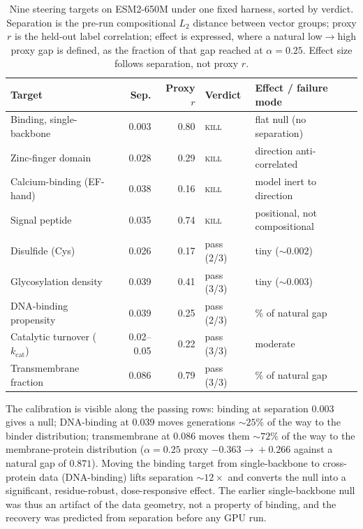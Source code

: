 \documentclass{article}
\begin{document}
\FloatBarrier
\begin{table}[htbp]
\centering
\caption{Nine steering targets on ESM2-650M under one fixed harness, sorted by
verdict. Separation is the pre-run compositional $L_2$ distance between vector
groups; proxy $r$ is the held-out label correlation; effect is expressed, where
a natural low$\rightarrow$high proxy gap is defined, as the fraction of that gap
reached at $\alpha=0.25$. Effect size follows separation, not proxy $r$.}
\label{tab:scoreboard}
\small
\begin{tabular}{@{}>{\raggedright\arraybackslash}p{3.5cm}
                    r r
                    >{\raggedright\arraybackslash}p{2.1cm}
                    >{\raggedright\arraybackslash}p{3.4cm}@{}}
\toprule
Target & Sep. & Proxy $r$ & Verdict & Effect / failure mode \\
\midrule
Binding, single-backbone   & 0.003 & 0.80 & \textsc{kill} & flat null (no separation) \\
Zinc-finger domain         & 0.028 & 0.29 & \textsc{kill} & direction anti-correlated \\
Calcium-binding (EF-hand)  & 0.038 & 0.16 & \textsc{kill} & model inert to direction \\
Signal peptide             & 0.035 & 0.74 & \textsc{kill} & positional, not compositional \\
\addlinespace
Disulfide (Cys)            & 0.026 & 0.17 & pass (2/3) & tiny ($\sim\!0.002$) \\
Glycosylation density      & 0.039 & 0.41 & pass (3/3) & tiny ($\sim\!0.003$) \\
DNA-binding propensity     & 0.039 & 0.25 & pass (2/3) & 25\% of natural gap \\
Catalytic turnover ($k_{\mathrm{cat}}$) & 0.02--0.05 & 0.22 & pass (3/3) & moderate \\
Transmembrane fraction     & 0.086 & 0.79 & pass (3/3) & 72\% of natural gap \\
\bottomrule
\end{tabular}
\end{table}
\FloatBarrier

The calibration is visible along the passing rows: binding at separation
$0.003$ gives a null; DNA-binding at $0.039$ moves generations $\sim\!25\%$ of
the way to the binder distribution; transmembrane at $0.086$ moves them
$\sim\!72\%$ of the way to the membrane-protein distribution
($\alpha=0.25$ proxy $-0.363\!\rightarrow\!+0.266$ against a natural gap of
$0.871$). Moving the binding target from single-backbone to cross-protein data
(DNA-binding) lifts separation $\sim\!12\times$ and converts the null into a
significant, residue-robust, dose-responsive effect. The earlier
single-backbone null was thus an artifact of the data geometry, not a property
of binding, and the recovery was predicted from separation before any GPU run.
\end{document}
